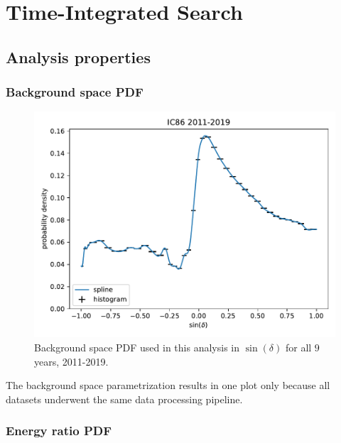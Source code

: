 \chapter{Time-Integrated Search}

\section{Analysis properties}


\subsection{Background space PDF}

\begin{figure}
    \centering
    \includegraphics[width=\linewidth]{Plots/05_csky/bg_space_pdf.pdf}
    \caption{Background space PDF used in this analysis in $\sin{(\delta)}$ for all $\num{9}$ years, 2011-2019.}
\end{figure}

The background space parametrization results in one plot only because all datasets underwent the same data processing pipeline.

\subsection{Energy ratio PDF}

